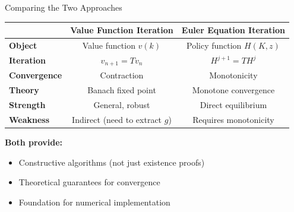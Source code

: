 \begin{frame}{Comparing the Two Approaches}
\begin{center}
\renewcommand{\arraystretch}{1.3}
\begin{tabular}{|l|c|c|}
\hline
 & \textbf{Value Function Iteration} & \textbf{Euler Equation Iteration} \\
\hline
\textbf{Object} & Value function $v(k)$ & Policy function $H(K,z)$ \\
\textbf{Iteration} & $v_{n+1} = Tv_n$ & $H^{j+1} = TH^j$ \\
\textbf{Convergence} & Contraction & Monotonicity \\
\textbf{Theory} & Banach fixed point & Monotone convergence \\
\hline
\textbf{Strength} & General, robust & Direct equilibrium \\
\textbf{Weakness} & Indirect (need to extract $g$) & Requires monotonicity \\
\hline
\end{tabular}
\end{center}

\bigskip
\textbf{Both provide:}
\begin{itemize}
    \item Constructive algorithms (not just existence proofs)
    \item Theoretical guarantees for convergence
    \item Foundation for numerical implementation
\end{itemize}
\end{frame}

